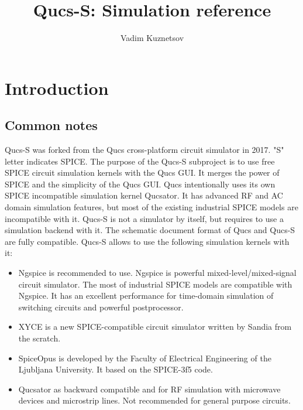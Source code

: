 \documentclass[a4paper,12pt]{article}
\title{Qucs-S: Simulation reference}
\author{Vadim Kuznetsov}
\begin{document}
\maketitle

\tableofcontents

\listoffigures

\listoftables



\clearpage
\section{Introduction} \label{sec:intro}

\subsection{Common notes}

Qucs-S was forked from the Qucs cross-platform circuit simulator in 2017. "S" letter indicates SPICE. The purpose of the Qucs-S subproject is to use free SPICE circuit simulation kernels with the Qucs GUI. It merges the power of SPICE and the simplicity of the Qucs GUI. Qucs intentionally uses its own SPICE incompatible simulation kernel Qucsator. It has advanced RF and AC domain simulation features, but most of the existing industrial SPICE models are incompatible with it. Qucs-S is not a simulator by itself, but requires to use a simulation backend with it. The schematic document format of Qucs and Qucs-S are fully compatible. Qucs-S allows to use the following simulation kernels with it:

\begin{itemize}
 \item  Ngspice is recommended to use. Ngspice is powerful mixed-level/mixed-signal circuit simulator. The most of industrial SPICE models are compatible with Ngspice. It has an excellent performance for time-domain simulation of switching circuits and powerful postprocessor.
 \item XYCE is a new SPICE-compatible circuit simulator written by Sandia from the scratch. 
 \item SpiceOpus is developed by the Faculty of Electrical Engineering of the Ljubljana University. It based on the SPICE-3f5 code.
 \item Qucsator as backward compatible and for RF simulation with microwave devices and microstrip lines. Not recommended for general purpose circuits. 
\end{itemize}
\end{document}
